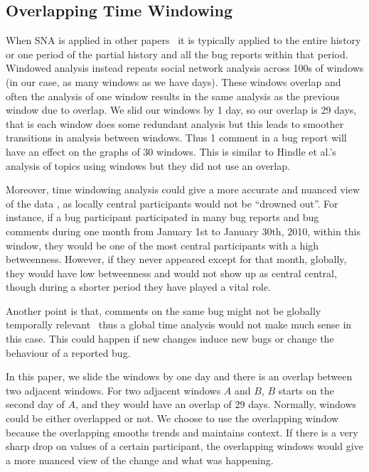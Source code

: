 \documentclass[conference]{IEEEtran}
\begin{document}
\subsection{Overlapping Time Windowing}

When SNA is applied in other
papers~\cite{MSR:christ,ICSEsocio:meneely} it is typically applied to
the entire history or one period of the partial history and all the
bug reports within that period.
Windowed analysis instead repeats social network analysis across 100s
of windows (in our case, as many windows as we have days). These
windows overlap and often the analysis of one window results in the
same analysis as the previous window due to overlap. We slid our
windows by 1 day, so our overlap is 29 days, that is each window does
some redundant analysis but this leads to smoother transitions in
analysis between windows. Thus 1 comment in a bug report will have an
effect on the graphs of 30 windows. This is similar to Hindle et
al.'s\cite{ICSMwindowed:hindle} analysis of topics using windows but
they did not use an overlap.

Moreover, time windowing analysis could give a more accurate and
nuanced view of the data \cite{ICSEsocio:meneely}
\cite{ICSMwindowed:hindle}, as locally central participants would not
be ``drowned out''. For instance, if a
bug participant participated in many bug reports and bug comments during one
month from January 1st to January 30th, 2010, within this window, they
would be one of the most central participants with a high
betweenness. However, if they never appeared except for that
month, globally, they would have low betweenness and would not show up
as central
central, though during a shorter period they have played a vital role. 


Another point is that, comments on the same bug might not be globally
temporally relevant~\cite{Springer:kidane,Procedia:ibaa} thus 
 a global time analysis would not make much sense in this case. This
 could happen if new changes induce new bugs or change the behaviour
 of a reported bug.

In this paper, we slide the windows by one day and there
is an overlap between two adjacent windows. For two adjacent windows
$A$ and $B$, $B$ starts on the second day of $A$, and they would have
an overlap of 29 days. Normally, windows could be either
overlapped or not. We choose to use the overlapping window because the
overlapping smooths trends and maintains context. If there
is a very sharp drop on values of a certain participant, the
overlapping windows would give a more nuanced view of the change and
what was happening.
\end{document}
